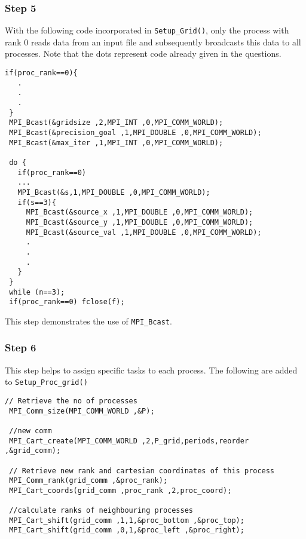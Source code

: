 \subsubsection*{Step 5}
With the following code incorporated in \texttt{Setup\_Grid()}, only the process with rank 0 reads data from an input file and subsequently broadcasts this data to all processes. Note that the dots represent code already given in the questions.\\
\begin{lstlisting}[style=CStyle]
 if(proc_rank==0){
   .
   .
   .
 }
 MPI_Bcast(&gridsize ,2,MPI_INT ,0,MPI_COMM_WORLD);
 MPI_Bcast(&precision_goal ,1,MPI_DOUBLE ,0,MPI_COMM_WORLD);
 MPI_Bcast(&max_iter ,1,MPI_INT ,0,MPI_COMM_WORLD);

 do {
   if(proc_rank==0)
   ...
   MPI_Bcast(&s,1,MPI_DOUBLE ,0,MPI_COMM_WORLD);
   if(s==3){
     MPI_Bcast(&source_x ,1,MPI_DOUBLE ,0,MPI_COMM_WORLD);
     MPI_Bcast(&source_y ,1,MPI_DOUBLE ,0,MPI_COMM_WORLD);
     MPI_Bcast(&source_val ,1,MPI_DOUBLE ,0,MPI_COMM_WORLD);
     .
     .
     .
   }
 }
 while (n==3);
 if(proc_rank==0) fclose(f); 
\end{lstlisting}
This step demonstrates the use of \texttt{MPI\_Bcast}.
\subsubsection*{Step 6}
This step helps to assign specific tasks to each process. The following are added to \texttt{Setup\_Proc\_grid()}
\begin{lstlisting}[style=CStyle]
 // Retrieve the no of processes
 MPI_Comm_size(MPI_COMM_WORLD ,&P);
 
 //new comm
 MPI_Cart_create(MPI_COMM_WORLD ,2,P_grid,periods,reorder ,&grid_comm);

 // Retrieve new rank and cartesian coordinates of this process
 MPI_Comm_rank(grid_comm ,&proc_rank);
 MPI_Cart_coords(grid_comm ,proc_rank ,2,proc_coord);
 
 //calculate ranks of neighbouring processes
 MPI_Cart_shift(grid_comm ,1,1,&proc_bottom ,&proc_top);
 MPI_Cart_shift(grid_comm ,0,1,&proc_left ,&proc_right);
\end{lstlisting}
